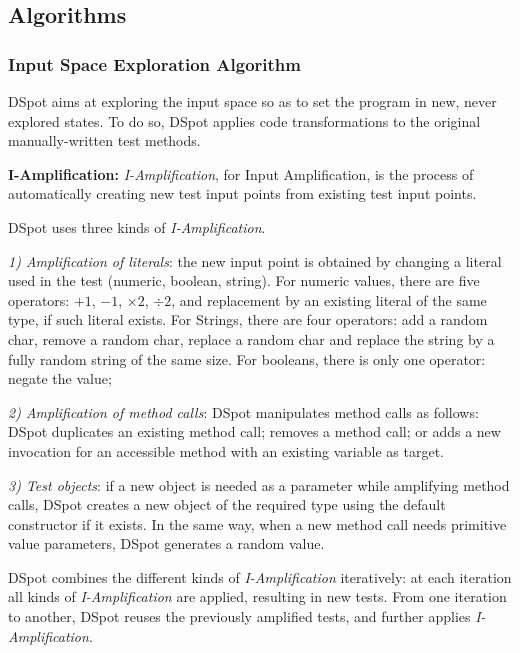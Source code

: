 \documentclass[table,xcdraw,smallextended]{svjour3}
\newcommand{\Iampl}{\emph{I-Amplification}\xspace}
\newcommand{\dspot}{DSpot\xspace}
\begin{document}
\subsection{Algorithms}

\subsubsection{Input Space Exploration Algorithm}
\label{subsec:input-space-exploration}

\dspot aims at exploring the input space so as to set the program in new, never explored states. To do so, \dspot applies code transformations to the original manually-written test methods. 

\textbf{I-Amplification:} \Iampl, for Input Amplification, is the process of automatically creating new test input points from existing test input points.

\dspot uses three kinds of \Iampl.

\emph{1) Amplification of literals}: the new input point is obtained by changing a literal used in the test (numeric, boolean, string).
For numeric values, there are five operators: $+1$, $-1$, $\times 2$, $ \div 2$, and replacement by an existing literal of the same type, if such literal exists.
For Strings, there are four operators: add a random char, remove a random char, replace a random char and replace the string by a fully random string of the same size.
For booleans, there is only one operator: negate the value;

\emph{2) Amplification of method calls}: \dspot manipulates method calls as follows:
\dspot duplicates an existing method call; removes a method call;
or adds a new invocation for an accessible method with an existing variable as target.

\emph{3) Test objects}:
if a new object is needed as a parameter while amplifying method calls, \dspot creates a new object of the required type using the default constructor if it exists.
In the same way, when a new method call needs primitive value parameters, \dspot generates a random value.

\dspot combines the different kinds of \Iampl iteratively: at each iteration all kinds of \Iampl are applied, resulting in new tests. 
From one iteration to another, \dspot reuses the previously amplified tests, and further applies \Iampl{}.
\end{document}
